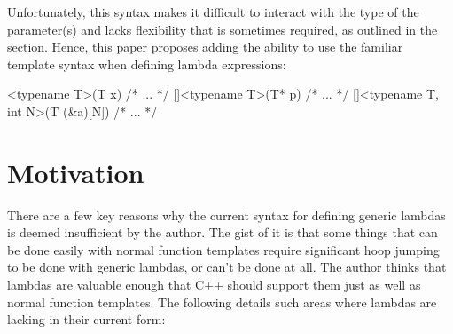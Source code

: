 \documentclass{wg21}
\begin{document}
Unfortunately, this syntax makes it difficult to interact with the type of the
parameter(s) and lacks flexibility that is sometimes required, as outlined in
the  section. Hence, this paper proposes adding the ability
to use the familiar template syntax when defining lambda expressions:

\begin{cpp}
[]<typename T>(T x) { /* ... */ }
[]<typename T>(T* p) { /* ... */ }
[]<typename T, int N>(T (&a)[N]) { /* ... */ }
\end{cpp}


\section{Motivation} \label{motivation}
There are a few key reasons why the current syntax for defining generic lambdas
is deemed insufficient by the author. The gist of it is that some things that
can be done easily with normal function templates require significant hoop
jumping to be done with generic lambdas, or can't be done at all. The author
thinks that lambdas are valuable enough that C++ should support them just as
well as normal function templates. The following details such areas where
lambdas are lacking in their current form:
\end{document}
